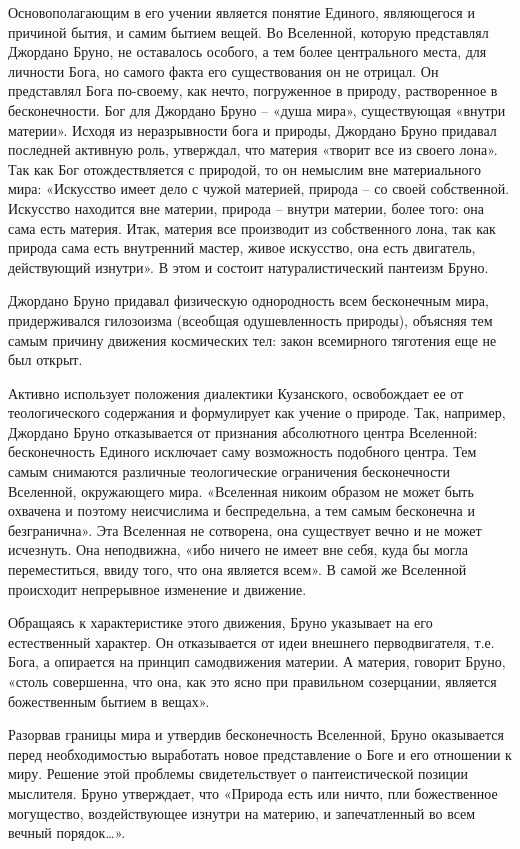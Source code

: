 \documentclass[a4paper, 14pt]{extreport}
\begin{document}
Основополагающим в его учении является понятие Единого, являющегося и
причиной бытия, и самим бытием вещей. Во Вселенной, которую представлял
Джордано Бруно, не оставалось особого, а тем более центрального места,
для личности Бога, но самого факта его существования он не отрицал. Он
представлял Бога по-своему, как нечто, погруженное в природу,
растворенное в бесконечности. Бог для Джордано Бруно -- «душа мира»,
существующая «внутри материи». Исходя из неразрывности бога и природы,
Джордано Бруно придавал последней активную роль, утверждал, что материя
«творит все из своего лона». Так как Бог отождествляется с природой, то
он немыслим вне материального мира: «Искусство имеет дело с чужой
материей, природа -- со своей собственной. Искусство находится вне
материи, природа -- внутри материи, более того: она сама есть материя.
Итак, материя все производит из собственного лона, так как природа сама
есть внутренний мастер, живое искусство, она есть двигатель, действующий
изнутри». В этом и состоит натуралистический пантеизм Бруно.

Джордано Бруно придавал физическую однородность всем бесконечным мира,
придерживался гилозоизма (всеобщая одушевленность природы), объясняя тем
самым причину движения космических тел: закон всемирного тяготения еще
не был открыт.

Активно использует положения диалектики Кузанского, освобождает ее от
теологического содержания и формулирует как учение о природе. Так,
например, Джордано Бруно отказывается от признания абсолютного центра
Вселенной: бесконечность Единого исключает саму возможность подобного
центра. Тем самым снимаются различные теологические ограничения
бесконечности Вселенной, окружающего мира. «Вселенная никоим образом не
может быть охвачена и поэтому неисчислима и беспредельна, а тем самым
бесконечна и безгранична». Эта Вселенная не сотворена, она существует
вечно и не может исчезнуть. Она неподвижна, «ибо ничего не имеет вне
себя, куда бы могла переместиться, ввиду того, что она является всем». В
самой же Вселенной происходит непрерывное изменение и движение.

Обращаясь к характеристике этого движения, Бруно указывает на его
естественный характер. Он отказывается от идеи внешнего
перводвигателя, т.е. Бога, а опирается на принцип самодвижения материи.
А материя, говорит Бруно, «столь совершенна, что она, как это ясно при
правильном созерцании, является божественным бытием в вещах».

Разорвав границы мира и утвердив бесконечность Вселенной, Бруно
оказывается перед необходимостью выработать новое представление о Боге и
его отношении к миру. Решение этой проблемы свидетельствует о
пантеистической позиции мыслителя. Бруно утверждает, что «Природа есть
или ничто, пли божественное могущество, воздействующее изнутри на
материю, и запечатленный во всем вечный порядок\ldots».
\end{document}
